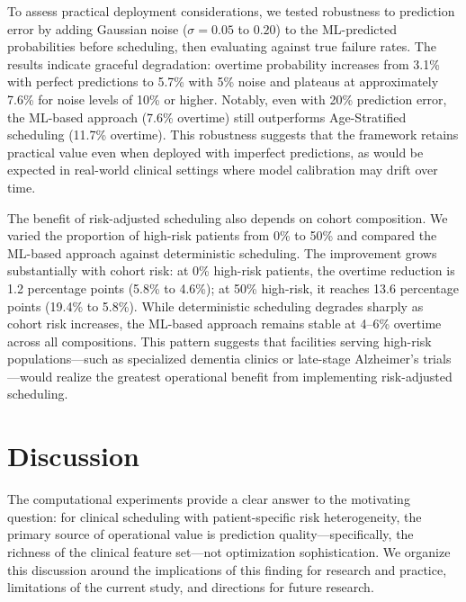\documentclass[11pt,a4paper]{article}
\begin{document}
To assess practical deployment considerations, we tested robustness to prediction error by adding Gaussian noise ($\sigma = 0.05$ to $0.20$) to the ML-predicted probabilities before scheduling, then evaluating against true failure rates. The results indicate graceful degradation: overtime probability increases from 3.1\% with perfect predictions to 5.7\% with 5\% noise and plateaus at approximately 7.6\% for noise levels of 10\% or higher. Notably, even with 20\% prediction error, the ML-based approach (7.6\% overtime) still outperforms Age-Stratified scheduling (11.7\% overtime). This robustness suggests that the framework retains practical value even when deployed with imperfect predictions, as would be expected in real-world clinical settings where model calibration may drift over time.

The benefit of risk-adjusted scheduling also depends on cohort composition. We varied the proportion of high-risk patients from 0\% to 50\% and compared the ML-based approach against deterministic scheduling. The improvement grows substantially with cohort risk: at 0\% high-risk patients, the overtime reduction is 1.2 percentage points (5.8\% to 4.6\%); at 50\% high-risk, it reaches 13.6 percentage points (19.4\% to 5.8\%). While deterministic scheduling degrades sharply as cohort risk increases, the ML-based approach remains stable at 4--6\% overtime across all compositions. This pattern suggests that facilities serving high-risk populations---such as specialized dementia clinics or late-stage Alzheimer's trials---would realize the greatest operational benefit from implementing risk-adjusted scheduling.



\section{Discussion}
\label{sec:discussion}

The computational experiments provide a clear answer to the motivating question: for clinical scheduling with patient-specific risk heterogeneity, the primary source of operational value is prediction quality---specifically, the richness of the clinical feature set---not optimization sophistication. We organize this discussion around the implications of this finding for research and practice, limitations of the current study, and directions for future research.
\end{document}
